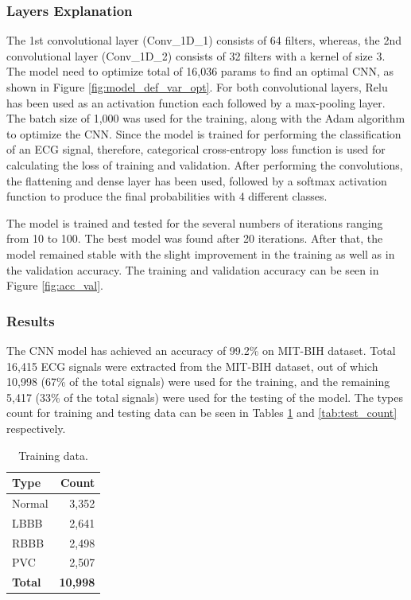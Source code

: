 \subsubsection{Layers Explanation}
The 1st convolutional layer (Conv\_1D\_1) consists of 64 filters, whereas, the 2nd convolutional layer (Conv\_1D\_2) consists of 32 filters with a kernel of size 3. The model need to optimize total of 16,036 params to find an optimal CNN, as shown in Figure \ref{fig:model_def_var_opt}. For both convolutional layers, Relu has been used as an activation function each followed by a max-pooling layer. The batch size of 1,000 was used for the training, along with the Adam algorithm to optimize the CNN. Since the model is trained for performing the classification of an ECG signal, therefore, categorical cross-entropy loss function is used for calculating the loss of training and validation. After performing the convolutions, the flattening and dense layer has been used, followed by a softmax activation function to produce the final probabilities with 4 different classes.


The model is trained and tested for the several numbers of iterations ranging from 10 to 100. The best model was found after 20 iterations. After that, the model remained stable with the slight improvement in the training as well as in the validation accuracy. The training and validation accuracy can be seen in Figure \ref{fig:acc_val}.



\subsubsection{Results}
The CNN model has achieved an accuracy of 99.2\% on MIT-BIH dataset. Total 16,415 ECG signals were extracted from the MIT-BIH dataset, out of which 10,998 (67\% of the total signals) were used for the training, and the remaining 5,417 (33\% of the total signals) were used for the testing of the model. The types count for training and testing data can be seen in Tables \ref{tab:train_count} and \ref{tab:test_count} respectively. 

\renewcommand{\arraystretch}{2}
\begin{table}
	\caption{Training data.} \label{tab:train_count}
	
	\begin{center}
		\begin{tabular}{ | l | r | }
			\hline
			\textbf{Type} & \textbf{Count} \\ \hline
			Normal & 3,352 \\ \hline
			LBBB  & 2,641  \\ \hline
			RBBB  & 2,498  \\ \hline
			PVC  & 2,507  \\ \hline
			\textbf{Total}  & \textbf{10,998}  \\ \hline
		\end{tabular}
	\end{center}
	
\end{table}


